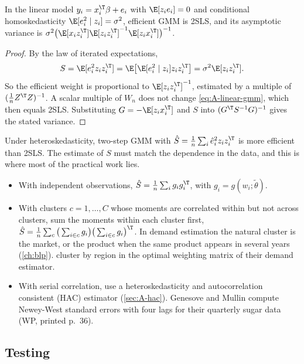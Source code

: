 \begin{proposition}\label{prop:A-gmm-2sls}
In the linear model $y_i = x_i^\T\beta + e_i$ with $\E[z_ie_i] = 0$ and conditional homoskedasticity
$\E[e_i^2 \mid z_i] = \sigma^2$, efficient GMM is 2SLS, and its asymptotic variance is
$\sigma^2\big(\E[x_iz_i^\T]\E[z_iz_i^\T]^{-1}\E[z_ix_i^\T]\big)^{-1}$.
\end{proposition}

\begin{proof}
By the law of iterated expectations,
\begin{equation*}
  S = \E[e_i^2z_iz_i^\T] = \E\big[\E[e_i^2 \mid z_i]z_iz_i^\T\big] = \sigma^2\E[z_iz_i^\T].
\end{equation*}
So the efficient weight is proportional to $\E[z_iz_i^\T]^{-1}$, estimated by a multiple of $(\frac{1}{n}Z^\T Z)^{-1}$.
A scalar multiple of $W_n$ does not change \eqref{eq:A-linear-gmm}, which then equals 2SLS. Substituting $G =
-\E[z_ix_i^\T]$ and $S$ into $(G^\T S^{-1}G)^{-1}$ gives the stated variance.
\end{proof}

Under heteroskedasticity, two-step GMM with $\hat S = \frac{1}{n}\sum_i\hat e_i^2z_iz_i^\T$ is more efficient than 2SLS. The
estimate of $S$ must match the dependence in the data, and this is where most of the practical work lies.
\begin{itemize}
  \item With independent observations, $\hat S = \frac{1}{n}\sum_ig_ig_i^\T$, with $g_i = g(w_i;\tilde\theta)$.
  \item With clusters $c = 1, \dots, C$ whose moments are correlated within but not across clusters, sum the moments within
  each cluster first, $\hat S = \frac{1}{n}\sum_c\big(\sum_{i \in c}g_i\big)\big(\sum_{i \in c}g_i\big)^\T$. In demand
  estimation the natural cluster is the market, or the product when the same product appears in several years
  (\cref{ch:blp}). \citet[p.~1775]{MillerWeinberg2017} cluster by region in the optimal weighting matrix of their
  demand estimator.
  \item With serial correlation, use a heteroskedasticity and autocorrelation consistent (HAC) estimator
  (\cref{sec:A-hac}). Genesove and Mullin compute Newey-West standard errors with four lags for their quarterly sugar data
  (WP, printed p.~36).
\end{itemize}

\subsection{Testing}\label{sec:A-gmm-tests}

